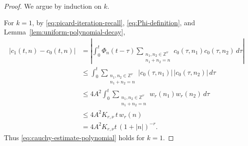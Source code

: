 \documentclass[12pt,reqno,tbtags]{amsart}
\newcommand\1{\mathbbm{1}}
\begin{document}
\begin{proof}
We argue by induction on $k$.

For $k=1$, by \eqref{eq:picard-iteration-recall}, \eqref{eq:Phi-definition}, and
Lemma~\ref{lem:uniform-polynomial-decay},
\begin{align*}
|c_1(t,n)-c_0(t,n)|
&=
\left|
\int_0^t \Phi_n(t-\tau)
\sum_{\substack{n_1,n_2\in\mathbb Z^\nu\\ n_1+n_2=n}}
c_0(\tau,n_1)c_0(\tau,n_2)\,d\tau
\right| \\
&\le
\int_0^t
\sum_{\substack{n_1,n_2\in\mathbb Z^\nu\\ n_1+n_2=n}}
|c_0(\tau,n_1)|\,|c_0(\tau,n_2)|\,d\tau \\
&\le
4A^2 \int_0^t
\sum_{\substack{n_1,n_2\in\mathbb Z^\nu\\ n_1+n_2=n}}
w_r(n_1)w_r(n_2)\,d\tau \\
&\le
4A^2K_{r,\nu}\,t\,w_r(n) \\
&=
4A^2K_{r,\nu}t\,(1+|n|)^{-r}.
\end{align*}
Thus \eqref{eq:cauchy-estimate-polynomial} holds for $k=1$.


\end{proof}
\end{document}
